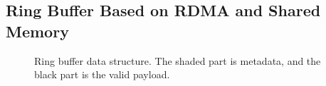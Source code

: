 \subsection{Ring Buffer Based on RDMA and Shared Memory}
\label{socksdirect:subsec:lockless-queue}

\begin{figure}[htbp]
	\centering
	\hspace{0.02\textwidth}
	
	\caption{Ring buffer data structure. The shaded part is metadata, and the black part is the valid payload.}
\end{figure}


